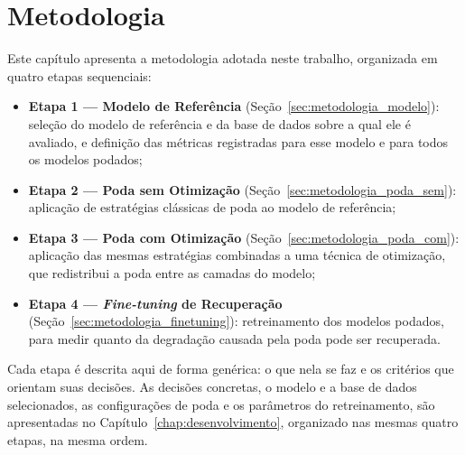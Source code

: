 
\chapter{Metodologia}\label{chap:metodologia}

Este capítulo apresenta a metodologia adotada neste trabalho, organizada em quatro etapas
sequenciais:

\begin{itemize}
    \item \textbf{Etapa 1 --- Modelo de Referência} (Seção~\ref{sec:metodologia_modelo}):
          seleção do modelo de referência e da base de dados sobre a qual ele é avaliado,
          e definição das métricas registradas para esse modelo e para todos os modelos
          podados;
    \item \textbf{Etapa 2 --- Poda sem Otimização} (Seção~\ref{sec:metodologia_poda_sem}):
          aplicação de estratégias clássicas de poda ao modelo de referência;
    \item \textbf{Etapa 3 --- Poda com Otimização} (Seção~\ref{sec:metodologia_poda_com}):
          aplicação das mesmas estratégias combinadas a uma técnica de otimização, que
          redistribui a poda entre as camadas do modelo;
    \item \textbf{Etapa 4 --- \textit{Fine-tuning} de Recuperação}
          (Seção~\ref{sec:metodologia_finetuning}): retreinamento dos modelos podados, para
          medir quanto da degradação causada pela poda pode ser recuperada.
\end{itemize}

Cada etapa é descrita aqui de forma genérica: o que nela se faz e os critérios que orientam
suas decisões. As decisões concretas, o modelo e a base de dados selecionados, as
configurações de poda e os parâmetros do retreinamento, são apresentadas no
Capítulo~\ref{chap:desenvolvimento}, organizado nas mesmas quatro etapas, na mesma ordem.

